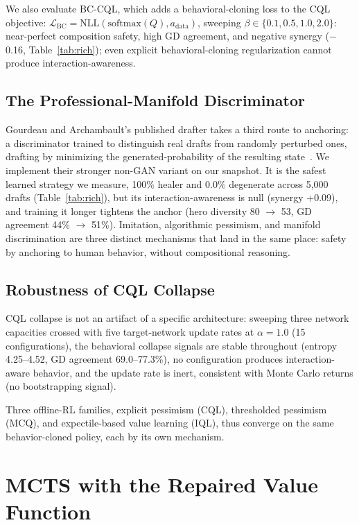 \documentclass[journal]{IEEEtran}
\begin{document}
We also evaluate BC-CQL, which adds a behavioral-cloning loss to the CQL objective: $\mathcal{L}_\text{BC} = \text{NLL}(\text{softmax}(Q), a_\text{data})$, sweeping $\beta \in \{0.1, 0.5, 1.0, 2.0\}$: near-perfect composition safety, high GD agreement, and negative synergy ($-$0.16, Table~\ref{tab:rich}); even explicit behavioral-cloning regularization cannot produce interaction-awareness.

\subsection{The Professional-Manifold Discriminator}

Gourdeau and Archambault's published drafter takes a third route to anchoring: a discriminator trained to distinguish real drafts from randomly perturbed ones, drafting by minimizing the generated-probability of the resulting state~\cite{gourdeau2021discriminative}. We implement their stronger non-GAN variant on our snapshot. It is the safest learned strategy we measure, 100\% healer and 0.0\% degenerate across 5{,}000 drafts (Table~\ref{tab:rich}), but its interaction-awareness is null (synergy +0.09), and training it longer tightens the anchor (hero diversity 80 $\to$ 53, GD agreement 44\% $\to$ 51\%). Imitation, algorithmic pessimism, and manifold discrimination are three distinct mechanisms that land in the same place: safety by anchoring to human behavior, without compositional reasoning.

\subsection{Robustness of CQL Collapse}

CQL collapse is not an artifact of a specific architecture: sweeping three network capacities crossed with five target-network update rates at $\alpha = 1.0$ (15 configurations), the behavioral collapse signals are stable throughout (entropy 4.25--4.52, GD agreement 69.0--77.3\%), no configuration produces interaction-aware behavior, and the update rate is inert, consistent with Monte Carlo returns (no bootstrapping signal).

Three offline-RL families, explicit pessimism (CQL), thresholded pessimism (MCQ), and expectile-based value learning (IQL), thus converge on the same behavior-cloned policy, each by its own mechanism.

\section{MCTS with the Repaired Value Function}
\label{sec:mcts}
\end{document}
